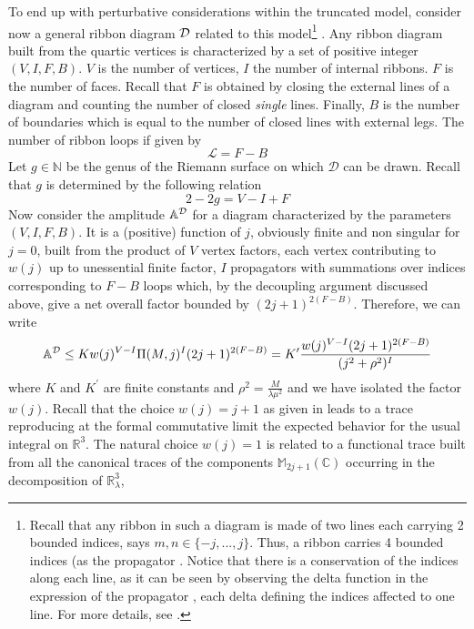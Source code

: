 \documentclass[10pt]{book}
\theoremstyle{break}
\begin{document}
To end up with perturbative considerations within the truncated model, consider now a general ribbon diagram ${\cal{D}}$ related to this model\footnote{Recall that any ribbon in such a diagram is made of two lines each carrying 2 bounded indices, says $m,n\in\{-j,...,j \}$. Thus, a ribbon carries 4 bounded indices (as the propagator %
. Notice that there is a conservation of the indices along each line, as it can be seen by observing the delta function in the expression of the propagator %
, each delta defining the indices affected to one line. For more details, see %
.}
. Any ribbon diagram built from the quartic vertices is characterized by a set of positive integer $(V,I,F,B)$. $V$ is the number of vertices, $I$ the number of internal ribbons. $F$ is the number of faces. Recall that $F$ is obtained by closing the external lines of a diagram and counting the number of closed {\it{single}} lines. Finally, $B$ is the number of boundaries which is equal to the number of closed lines with external legs. The number of ribbon loops if given by
\begin{equation}
\mathcal{L}=F-B %
\end{equation}
Let $g\in\mathbb{N}$ be the genus of the Riemann surface on which $\mathcal{D}$ can be drawn. Recall that $g$ is determined by the following relation
\begin{equation}
2-2g=V-I+F %
\end{equation}
Now consider the amplitude ${\mathbb{A}}^{\cal{D}}$ for a diagram characterized by the parameters $(V,I,F,B)$. It is a (positive) function of $j$, obviously finite and non singular for $j=0$, built from the product of $V$ vertex factors, each vertex contributing to $w(j)$ up to unessential finite factor, $I$ propagators %
with summations over indices corresponding to $F-B$ loops which, by the decoupling argument discussed above, give a net overall factor bounded by $(2j+1)^{2(F-B)}$. Therefore, we can write
\begin{equation}
{\mathbb{A}}^{\cal{D}}\le Kw(j)^{V-I}\Pi(M,j)^{I}(2j+1)^{2(F-B)}=K^\prime\frac{w(j)^{V-I}(2j+1)^{2(F-B)}}{(j^2+\rho^2)^I}%
\end{equation}
where $K$ and $K^\prime$ are finite constants and $\rho^2=\frac{M}{\lambda\mu^2}$ and we have isolated the factor $w(j)$. Recall that the choice $w(j)=j+1$ as given in %
leads to a trace reproducing at the formal commutative limit the expected behavior for the usual integral on $\mathbb{R}^3$. The natural choice $w(j)=1$ is related to a functional trace built from all the canonical traces of the components $\mathbb{M}_{2j+1}(\mathbb{C})$ occurring in the decomposition of $\mathbb{R}^3_\lambda$, %
\end{document}
